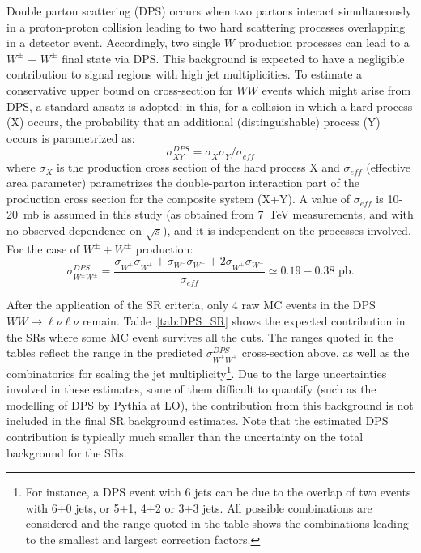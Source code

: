 Double parton scattering (DPS) occurs when two partons interact simultaneously in a proton-proton collision leading to two hard scattering 
processes overlapping in a detector event. 
Accordingly, two single $W$ production processes can lead to a $W^\pm$ + $W^\pm$ final state via DPS. 
This background is expected to have a negligible contribution to signal regions with high jet multiplicities.
To estimate a conservative upper bound on cross-section for $WW$ events which might arise from DPS, a standard ansatz is adopted: 
in this, for a collision in which a hard process (X) occurs, the probability that 
an additional (distinguishable) process (Y) occurs is parametrized as:
\begin{equation}
\sigma^{DPS}_{XY} = \sigma^{}_{X}\sigma^{}_{Y}/\sigma^{}_{eff}
\end{equation} 
where $\sigma^{}_{X}$ is the production cross section of the hard 
process X and $\sigma^{}_{eff}$ (effective area parameter) 
parametrizes the double-parton interaction part of the production 
cross section for the composite system (X+Y). 
A value of $\sigma^{}_{eff}$ is 10-20~mb is assumed in this study (as obtained from 7~TeV measurements, and with no observed dependence on $\sqrt{s}$), and it is independent on the processes involved. For the case of $W^\pm+W^\pm$ production:
\begin{equation}
\sigma^{DPS}_{W^\pm W^\pm} = \frac{ \sigma^{}_{W^+}\sigma^{}_{W^+} + \sigma^{}_{W^-}\sigma^{}_{W^-} + 2\sigma^{}_{W^+}\sigma^{}_{W^-}}{\sigma^{}_{eff} } \simeq 0.19-0.38\text{ pb.}
\end{equation} 

After the application of the SR criteria, only 4 raw MC events in the DPS $WW\to\ell\nu\ell\nu$ remain. 
Table~\ref{tab:DPS_SR} shows the expected contribution in the SRs where some MC event survives all the cuts. The ranges quoted in the tables reflect the range in the predicted $\sigma^{DPS}_{W^\pm W^\pm}$ cross-section above, as well as the combinatorics for scaling the jet multiplicity\footnote{For instance, a DPS event with 6 jets can be due to the overlap of two events with 6+0 jets, or 5+1, 4+2 or 3+3 jets. All possible combinations are considered and the range quoted in the table shows the combinations leading to the smallest and largest correction factors.}.
Due to the large uncertainties involved in these estimates, some of them difficult to quantify (such as the modelling of DPS by {\sc Pythia} at LO), the contribution from this background is not included in the final SR background estimates. 
Note that the estimated DPS contribution is typically much smaller than the uncertainty on the total background for the SRs.

